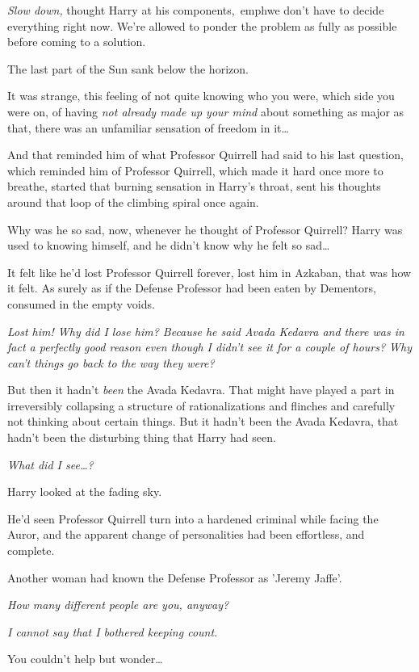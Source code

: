\emph{Slow down,} thought Harry at his components,\ emph{we don't have to 
decide everything right now. We're allowed to ponder the problem as fully as 
possible before coming to a solution.}

The last part of the Sun sank below the horizon.

It was strange, this feeling of not quite knowing who you were, which side you 
were on, of having \emph{not already made up your mind} about something as 
major as that, there was an unfamiliar sensation of freedom in it{\ldots}

And that reminded him of what Professor Quirrell had said to his last question, 
which reminded him of Professor Quirrell, which made it hard once more to 
breathe, started that burning sensation in Harry's throat, sent his thoughts 
around that loop of the climbing spiral once again.

Why was he so sad, now, whenever he thought of Professor Quirrell? Harry was 
used to knowing himself, and he didn't know why he felt so sad{\ldots}

It felt like he'd lost Professor Quirrell forever, lost him in Azkaban, that 
was how it felt. As surely as if the Defense Professor had been eaten by 
Dementors, consumed in the empty voids.

\emph{Lost him! Why did I lose him? Because he said Avada Kedavra and there was 
in fact a perfectly good reason even though I didn't see it for a couple of 
hours? Why can't things go back to the way they were?}

But then it hadn't \emph{been} the Avada Kedavra. That might have played a part 
in irreversibly collapsing a structure of rationalizations and flinches and 
carefully not thinking about certain things. But it hadn't been the Avada 
Kedavra, that hadn't been the disturbing thing that Harry had seen.

\emph{What did I see{\ldots}?}

Harry looked at the fading sky.

He'd seen Professor Quirrell turn into a hardened criminal while facing the 
Auror, and the apparent change of personalities had been effortless, and 
complete.

Another woman had known the Defense Professor as 'Jeremy Jaffe'.

\emph{How many different people are you, anyway?}

\emph{I cannot say that I bothered keeping count.}

You couldn't help but wonder{\ldots}

